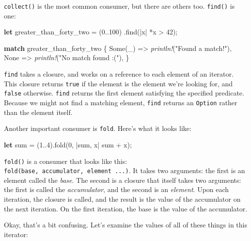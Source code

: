 \documentclass[a4paper,]{book}
\newenvironment{Shaded}{\begin{snugshade}}{\end{snugshade}}
\newcommand{\KeywordTok}[1]{\textcolor[rgb]{0.13,0.29,0.53}{\textbf{{#1}}}}
\newcommand{\DecValTok}[1]{\textcolor[rgb]{0.00,0.00,0.81}{{#1}}}
\newcommand{\ConstantTok}[1]{\textcolor[rgb]{0.00,0.00,0.00}{{#1}}}
\newcommand{\StringTok}[1]{\textcolor[rgb]{0.31,0.60,0.02}{{#1}}}
\newcommand{\PreprocessorTok}[1]{\textcolor[rgb]{0.56,0.35,0.01}{\textit{{#1}}}}
\newcommand{\NormalTok}[1]{{#1}}
\begin{document}
\texttt{collect()} is the most common consumer, but there are others
too. \texttt{find()} is one:

\begin{Shaded}
\begin{Highlighting}[]
\KeywordTok{let} \NormalTok{greater_than_forty_two = (}\DecValTok{0.}\NormalTok{.}\DecValTok{100}\NormalTok{)}
                             \NormalTok{.find(|x| *x > }\DecValTok{42}\NormalTok{);}

\KeywordTok{match} \NormalTok{greater_than_forty_two \{}
    \ConstantTok{Some}\NormalTok{(_) => }\PreprocessorTok{println!}\NormalTok{(}\StringTok{"Found a match!"}\NormalTok{),}
    \ConstantTok{None} \NormalTok{=> }\PreprocessorTok{println!}\NormalTok{(}\StringTok{"No match found :("}\NormalTok{),}
\NormalTok{\}}
\end{Highlighting}
\end{Shaded}

\texttt{find} takes a closure, and works on a reference to each element
of an iterator. This closure returns \texttt{true} if the element is the
element we're looking for, and \texttt{false} otherwise. \texttt{find}
returns the first element satisfying the specified predicate. Because we
might not find a matching element, \texttt{find} returns an
\texttt{Option} rather than the element itself.

Another important consumer is \texttt{fold}. Here's what it looks like:

\begin{Shaded}
\begin{Highlighting}[]
\KeywordTok{let} \NormalTok{sum = (}\DecValTok{1.}\NormalTok{.}\DecValTok{4}\NormalTok{).fold(}\DecValTok{0}\NormalTok{, |sum, x| sum + x);}
\end{Highlighting}
\end{Shaded}

\texttt{fold()} is a consumer that looks like this:
\texttt{fold(base,\ \textbar{}accumulator,\ element\textbar{}\ ...)}. It
takes two arguments: the first is an element called the \emph{base}. The
second is a closure that itself takes two arguments: the first is called
the \emph{accumulator}, and the second is an \emph{element}. Upon each
iteration, the closure is called, and the result is the value of the
accumulator on the next iteration. On the first iteration, the base is
the value of the accumulator.

Okay, that's a bit confusing. Let's examine the values of all of these
things in this iterator:
\end{document}
